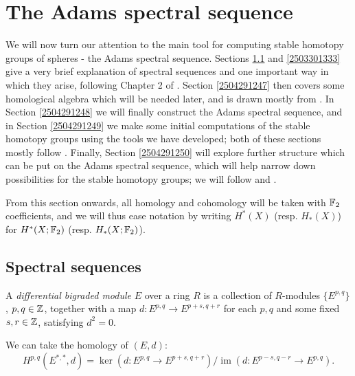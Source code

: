 \documentclass{MetricNotes2023}
\def\bb{\ensuremath\mathbb}
\def\inte{\ensuremath\mathbb{Z}}
\DeclareMathOperator{\im}{im}
\def\textcolour{\textcolor}
\begin{document}
\section{The Adams spectral sequence}

We will now turn our attention to the main tool for computing stable homotopy groups of spheres - the Adams spectral sequence. Sections \ref{2504041910} and \ref{2503301333} give a very brief explanation of spectral sequences and one important way in which they arise, following Chapter 2 of \autocite{spectral_sequences}. Section \ref{2504291247} then covers some homological algebra which will be needed later, and is drawn mostly from \autocite{weibel}. In Section \ref{2504291248} we will finally construct the Adams spectral sequence, and in Section \ref{2504291249} we make some initial computations of the stable homotopy groups using the tools we have developed; both of these sections mostly follow \autocite{hatcher5}. Finally, Section \ref{2504291250} will explore further structure which can be put on the Adams spectral sequence, which will help narrow down possibilities for the stable homotopy groups; we will follow \autocite{ass} and \autocite{rognes2}. 

From this section onwards, all homology and cohomology will be taken with \(\bb{F}_2\) coefficients, and we will thus ease notation by writing \(H^*(X)\) (resp. \(H_*(X)\)) for \(H^*(X; \bb{F}_2)\) (resp. \(H_*(X;\bb{F}_2)\)).

\subsection{Spectral sequences}\label{2504041910}


\begin{definition}
A \textit{differential bigraded module} \(E\) over a ring \(R\) is a collection of \(R\)-modules \(\{E^{p, q}\}\), \(p, q\in \inte\), together with a map \(d : E^{p, q} \to E^{p+s, q+r}\) for each \(p, q\) and some fixed \(s,r \in \inte\), satisfying \(d^2=0\). 
\end{definition}

We can take the homology of \((E, d)\):
\[H^{p, q}(E^{*, *}, d)=\ker(d : E^{p, q}\to E^{p+s, q+r})/\im(d : E^{p-s, q-r}\to E^{p, q}).\]
\end{document}
